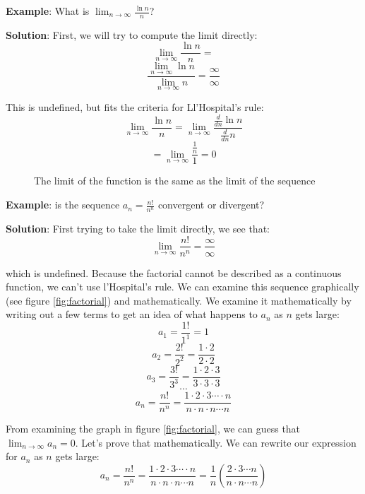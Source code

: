\textbf{Example}: What is $\lim_{n \to \infty} \frac{\ln{n}}{n}$? 

\textbf{Solution}: First, we will try to compute the limit directly:
$$\lim_{n \to \infty} \frac{\ln{n}}{n} = $$
$$\frac{\lim_{n \to \infty} \ln{n}}{\lim_{n \to \infty}n} = 
\frac{\infty}{\infty}$$

This is undefined, but fits the criteria for Ll'Hospital's rule:
$$\lim_{n \to \infty} \frac{\ln{n}}{n} = \lim_{n \to \infty} 
\frac{\frac{d}{dn}\ln{n}}{\frac{d}{dn}n}$$
$$= \lim_{n \to \infty} \frac{\frac{1}{n}}{1} = 0$$

\begin{figure}[htbp]
\centering
    \caption{The limit of the function is the same as the limit of the sequence}
    \label{fig:limit}
\end{figure}

\textbf{Example}: is the sequence $a_n = \frac{n!}{n^n}$ convergent or divergent? 

\textbf{Solution}: First trying to take the limit directly, we see that:
$$\lim_{n \to \infty} \frac{n!}{n^n} = \frac{\infty}{\infty}$$

which is undefined. Because the factorial cannot be described as a continuous 
function, we can't use l'Hospital's rule. We can examine this sequence 
graphically (see figure \ref{fig:factorial}) and mathematically. We examine it 
mathematically by writing out a few terms to get an idea of what happens to 
$a_n$ as $n$ gets large:
$$a_1 = \frac{1!}{1^1} = 1$$
$$a_2 = \frac{2!}{2^2} = \frac{1 \cdot 2}{2 \cdot 2}$$
$$a_3 = \frac{3!}{3^3} = \frac{1 \cdot 2 \cdot 3}{3 \cdot 3 \cdot 3}$$
$$\cdots$$
$$a_n = \frac{n!}{n^n} = \frac{1 \cdot 2 \cdot 3 \cdots \cdot n}{n 
\cdot n \cdot n \cdots n}$$

From examining the graph in figure \ref{fig:factorial}, we can guess that 
$\lim_{n \to \infty} a_n = 0$. Let's prove that mathematically. We can rewrite 
our expression for $a_n$ as $n$ gets large:
$$a_n = \frac{n!}{n^n} = \frac{1 \cdot 2 \cdot 3 \cdots \cdot n}{n 
\cdot n \cdot n \cdots n} = \frac{1}{n}(\frac{2 \cdot 3 \cdots n}{n 
\cdot n \cdots n})$$


